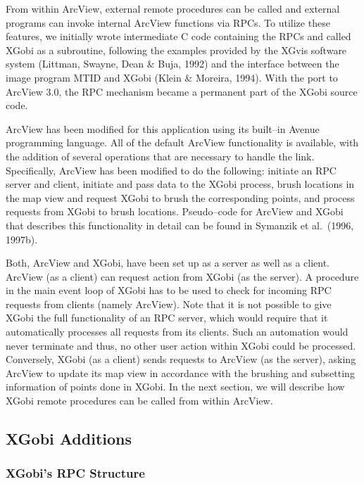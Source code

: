 From within ArcView, external remote procedures can be called and
external programs can invoke internal ArcView functions via RPCs.  To
utilize these features, we initially wrote intermediate C code
containing the RPCs and called XGobi as a subroutine, following the
examples provided by the XGvis software system (Littman, Swayne, Dean
\& Buja, 1992) and the interface between the image program MTID and
XGobi (Klein \& Moreira, 1994).  With the port to ArcView 3.0, the RPC
mechanism became a permanent part of the XGobi source code.

ArcView has been modified for this application using its built--in
Avenue programming language. All of the default ArcView
functionality is available, with the addition of 
several operations that are necessary to handle
the link. Specifically, ArcView has been modified to do the
following: initiate an RPC server and client, initiate and pass data
to the XGobi process, brush locations in the map view 
and request XGobi to brush the
corresponding points, and process requests from XGobi to brush locations.
Pseudo--code for ArcView and XGobi that describes this functionality in
detail can be found in Symanzik et al.\ (1996, 1997b).

Both, ArcView and XGobi, have been set up as a server as well as a client. 
ArcView (as a client) can request action from XGobi (as the server).   
A procedure in the main event loop of XGobi has to be used to check
for incoming RPC requests from clients (namely ArcView).
Note that it is not possible to give XGobi the full functionality of an
RPC server, which would require that it automatically processes all
requests from its clients. Such an automation would never
terminate and thus, no other user action within XGobi could be
processed.
Conversely, XGobi (as a client) sends requests to ArcView (as the
server), asking ArcView to update its map view in accordance with
the brushing and subsetting information of points done in XGobi. 
In the next section, we will describe
how XGobi remote procedures can be called from within ArcView.  


\subsection{XGobi Additions}

\subsubsection{XGobi's RPC Structure}

